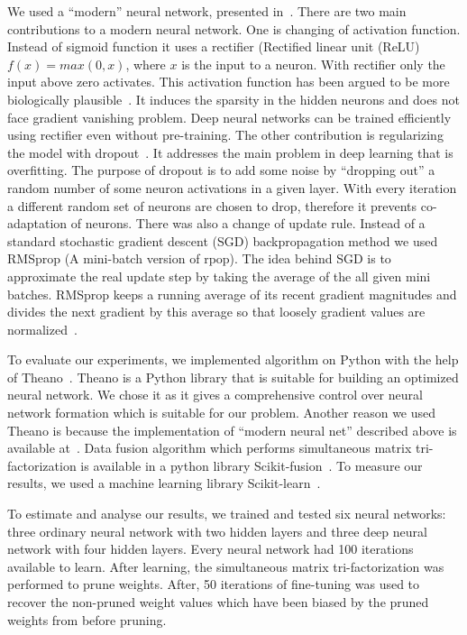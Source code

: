 \documentclass{article} %
\begin{document}
We used a “modern” neural network, presented in~\cite{github}. There are two
main contributions to a modern neural network. One is changing of activation
function. Instead of sigmoid function it uses a rectifier (Rectified linear 
unit (ReLU) $f(x) = max(0, x)$, where $x$ is the input to a neuron. With
rectifier only the input above zero activates. This
activation function has been argued to be more biologically
plausible~\cite{AISTATS2011_GlorotBB11}. It induces the sparsity in the hidden
neurons and does not face gradient vanishing problem. Deep neural networks
can be trained efficiently using rectifier even without pre-training. 
The other contribution is regularizing the model with
dropout~\cite{srivastava2014dropout}. It addresses
the main problem in deep learning that is overfitting. The purpose of dropout
is to add some noise by “dropping out” a random number of some neuron
activations in a given layer. With every iteration a different random set of
neurons are chosen to drop, therefore it prevents co-adaptation of neurons.
There was also a change of update rule. Instead of a standard stochastic
gradient descent (SGD) backpropagation method we used RMSprop (A mini-batch
version of rpop). The idea behind SGD is to approximate the real update step by
taking the average of the all given mini batches.
RMSprop keeps a running average of its recent gradient magnitudes and divides
the next gradient by this average so that loosely gradient values are
normalized~\cite{lecture}. 

To evaluate our experiments, we implemented algorithm on Python with the help
of Theano~\cite{Bastien-Theano-2012, bergstra+al:2010-scipy}. Theano is a
Python library that is suitable for building an optimized neural network. We
chose it as it gives a comprehensive control over neural network formation
which is suitable for our problem. Another reason we used Theano is because the
implementation of “modern neural net” described above is available 
at~\cite{github}.
Data fusion algorithm which performs simultaneous matrix
tri-factorization is available in a python library
Scikit-fusion~\cite{zitnik2015data}. To measure our results, we used a machine
learning library Scikit-learn~\cite{scikit-learn}.

To estimate and analyse our results, we trained and tested six neural networks: 
three 
ordinary neural network with two hidden layers and three deep neural network 
with four 
hidden layers. Every neural network had 100 iterations available to learn. After 
learning, the simultaneous matrix tri-factorization was performed to prune 
weights. After, 50 iterations of fine-tuning was used to recover the non-pruned 
weight values which have been biased by the pruned weights from before 
pruning. 
\end{document}
